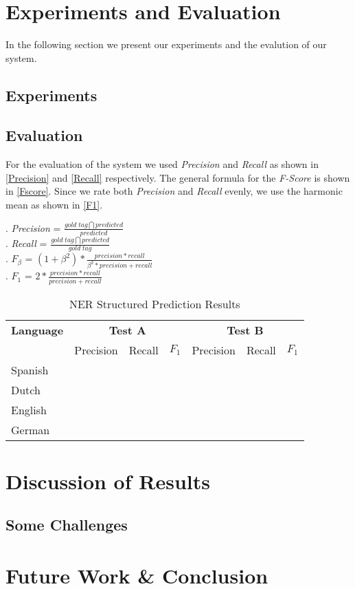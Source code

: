 \documentclass[11pt]{article}
\begin{document}
\section{Experiments and Evaluation}
In the following section we present our experiments and the evalution of our system.
\subsection*{Experiments}


\subsection*{Evaluation}
For the evaluation of the system we used \emph{Precision} and \emph{Recall} as shown in \ref{Precision} and \ref{Recall} respectively.
The general formula for the \emph{F-Score} is shown in \ref{Fscore}. Since we rate both \emph{Precision} and \emph{Recall} evenly, we 
use the harmonic mean as shown in \ref{F1}.


\ex. \emph{Precision} = $ \frac{gold\; tag \bigcap predicted}{predicted}$ \label{Precision}\\


\ex. \emph{Recall} = $ \frac{gold \;tag \bigcap predicted}{gold\; tag}$ \label{Recall}\\


\ex. $F_{\beta}$ = $ (1+\beta^2)*\frac{precision *recall}{\beta^2* precision + recall}$ \label{Fscore}\\

\ex. $F_1$ = $ 2*\frac{precision *recall}{precision + recall}$ \label{F1}\\




\begin{table}[h!]
\scriptsize
\begin{tabular}{| l | l l l| l l l |}

\hline
\bf Language & \multicolumn{3}{c|}{ \bf Test A}&\multicolumn{3}{c|}{ \bf Test B}\\
             & Precision & Recall & $F_1$ & Precision & Recall & $F_1$ \\ \hline
Spanish &       &          &     &          &               & \\
Dutch  &         &          &     &          &               &   \\
English &        &          &     &          &               &       \\
German &      &          &       &          &             & \\
\hline
\end{tabular}
\caption{NER Structured Prediction Results }
\label{table:Results}
\end{table}

\section{Discussion of Results}

\subsection*{Some Challenges} %


\section{Future Work \& Conclusion}






\end{document}
